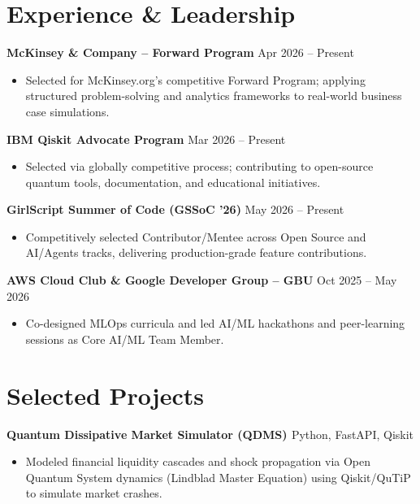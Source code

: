 \documentclass[9.5pt,letterpaper]{article}
\newenvironment{resumeItemize}{
  \begin{itemize}[leftmargin=0.14in, itemsep=0pt, parsep=0pt, topsep=1pt, partopsep=0pt, label=\textbullet]
}{\end{itemize}}
\newcommand{\resumeItem}[1]{\item \small #1}
\newcommand{\resumeHeading}[2]{
  \noindent\textbf{\small #1} \hfill \small #2 \\[0pt]
}
\begin{document}
\section*{Experience \& Leadership}

\resumeHeading{McKinsey \& Company -- Forward Program}{Apr 2026 -- Present}
\begin{resumeItemize}
  \resumeItem{Selected for McKinsey.org's competitive Forward Program; applying structured problem-solving and analytics frameworks to real-world business case simulations.}
\end{resumeItemize}

\resumeHeading{IBM Qiskit Advocate Program}{Mar 2026 -- Present}
\begin{resumeItemize}
  \resumeItem{Selected via globally competitive process; contributing to open-source quantum tools, documentation, and educational initiatives.}
\end{resumeItemize}

\resumeHeading{GirlScript Summer of Code (GSSoC '26)}{May 2026 -- Present}
\begin{resumeItemize}
  \resumeItem{Competitively selected Contributor/Mentee across Open Source and AI/Agents tracks, delivering production-grade feature contributions.}
\end{resumeItemize}

\resumeHeading{AWS Cloud Club \& Google Developer Group -- GBU}{Oct 2025 -- May 2026}
\begin{resumeItemize}
  \resumeItem{Co-designed MLOps curricula and led AI/ML hackathons and peer-learning sessions as Core AI/ML Team Member.}
\end{resumeItemize}

\section*{Selected Projects}

\resumeHeading{Quantum Dissipative Market Simulator (QDMS) \; \href{https://github.com/givemehat/Quantum-Dissipative-Market-Simulator-QDMS-}{\faGithub}}{Python, FastAPI, Qiskit}
\begin{resumeItemize}
  \resumeItem{Modeled financial liquidity cascades and shock propagation via Open Quantum System dynamics (Lindblad Master Equation) using Qiskit/QuTiP to simulate market crashes.}
\end{resumeItemize}
\end{document}
